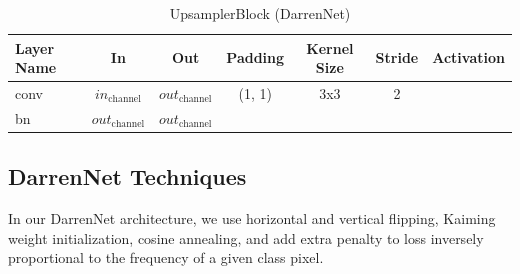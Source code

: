 \begin{table}[H]
	\setlength{\abovecaptionskip}{10pt}
	\centering
	\begin{tabular}{|l|c|c|c|c|c|c|}
		\hline
		\textbf{Layer Name} & \textbf{In}            & \textbf{Out}           & \textbf{Padding} & \textbf{Kernel Size} & \textbf{Stride} & \textbf{Activation} \\
		\hline
		conv                & $in_{\text{channel}}$  & $out_{\text{channel}}$ & (1, 1)           & 3x3                  & 2               &                     \\
		\hline
		bn                  & $out_{\text{channel}}$ & $out_{\text{channel}}$ &                  &                      &                 &                     \\
		\hline
	\end{tabular}
	\caption{UpsamplerBlock (DarrenNet)}
\end{table}

\subsection*{DarrenNet Techniques}
In our DarrenNet architecture, we use horizontal and vertical flipping, Kaiming weight initialization, cosine annealing, and add extra penalty to loss inversely proportional to the frequency of a given class pixel.

